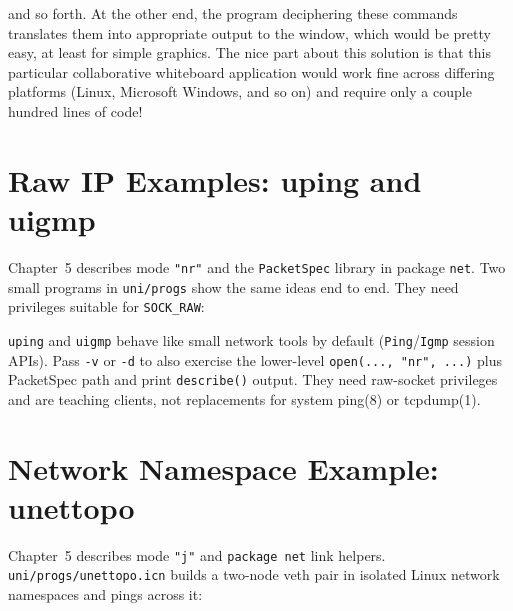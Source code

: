 
\noindent
and so forth. At the other end, the program deciphering these commands
translates them into appropriate output to the window, which would be
pretty easy, at least for simple graphics. The nice part about this
solution is that this particular collaborative whiteboard application
would work fine across differing platforms (Linux, Microsoft Windows,
and so on) and require only a couple hundred lines of code!

\section{Raw IP Examples: uping and uigmp}

Chapter~5 describes mode \texttt{"nr"} and the \texttt{PacketSpec}
library in package \texttt{net}. Two small programs in
\texttt{uni/progs} show the same ideas end to end. They need
privileges suitable for \texttt{SOCK\_RAW}:


\texttt{uping} and \texttt{uigmp} behave like small network tools by
default (\texttt{Ping}/\texttt{Igmp} session APIs). Pass
\texttt{-v} or \texttt{-d} to also exercise the lower-level
\texttt{open(..., "nr", ...)} plus PacketSpec path and print
\texttt{describe()} output. They need raw-socket privileges and are
teaching clients, not replacements for system ping(8) or tcpdump(1).

\section{Network Namespace Example: unettopo}

Chapter~5 describes mode \texttt{"j"} and \texttt{package net} link
helpers. \texttt{uni/progs/unettopo.icn} builds a two-node veth pair
in isolated Linux network namespaces and pings across it:

